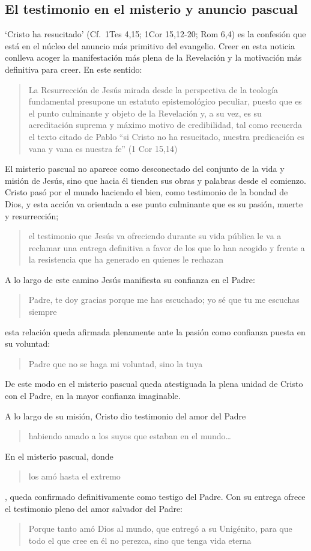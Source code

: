 \subsection{El testimonio en el misterio y anuncio pascual}

\enquote*{Cristo ha resucitado} (Cf.~1Tes 4,15; 1Cor 15,12-20; Rom 6,4) es la confesión que está en el núcleo del anuncio más primitivo del evangelio\autocite[Cf.][403]{ninot2009tf}. Creer en esta noticia conlleva acoger la manifestación más plena de la Revelación y la motivación más definitiva para creer. En este sentido: \blockquote[{\cite[405]{ninot2009tf}}]{La Resurrección de Jesús mirada desde la perspectiva de la teología fundamental presupone un estatuto epistemológico peculiar, puesto que es el punto culminante y objeto de la Revelación y, a su vez, es su acreditación suprema y máximo motivo de credibilidad, tal como recuerda el texto citado de Pablo ``si Cristo no ha resucitado, nuestra predicación es vana y vana es nuestra fe'' (1 Cor 15,14)}.

El misterio pascual no aparece como desconectado del conjunto de la vida y misión de Jesús, sino que hacia él tienden sus obras y palabras desde el comienzo. Cristo pasó por el mundo haciendo el bien, como testimonio de la bondad de Dios, y esta acción va orientada a ese punto culminante que es su pasión, muerte y resurrección; \blockquote[{\cite[127]{prades2015testimonio}}]{el testimonio que Jesús va ofreciendo durante su vida pública le va a reclamar una entrega definitiva a favor de los que lo han acogido y frente a la resistencia que ha generado en quienes le rechazan}.

A lo largo de este camino Jesús manifiesta su confianza en el Padre: \blockquote[][\,(Jn 11,41b-42a)]{Padre, te doy gracias porque me has escuchado; yo sé que tu me escuchas siempre}; esta relación queda afirmada plenamente ante la pasión como confianza puesta en su voluntad: \blockquote[][\,(Lc 22,42)]{Padre \textelp{} que no se haga mi voluntad, sino la tuya}. De este modo en el misterio pascual queda atestiguada la plena unidad de Cristo con el Padre, en la mayor confianza imaginable\autocite[Cf.~][127]{prades2015testimonio}.

A lo largo de su misión, Cristo dio testimonio del amor del Padre \blockquote[][\,(Jn 13,1)]{habiendo amado a los suyos que estaban en el mundo\ldots}. En el misterio pascual, donde \blockquote[][\,(ibíd.)]{los amó hasta el extremo}, queda confirmado definitivamente como testigo del Padre. Con su entrega ofrece el testimonio pleno del amor salvador del Padre: \blockquote[][\,(Jn 3,16)]{Porque tanto amó Dios al mundo, que entregó a su Unigénito, para que todo el que cree en él no perezca, sino que tenga vida eterna}.

